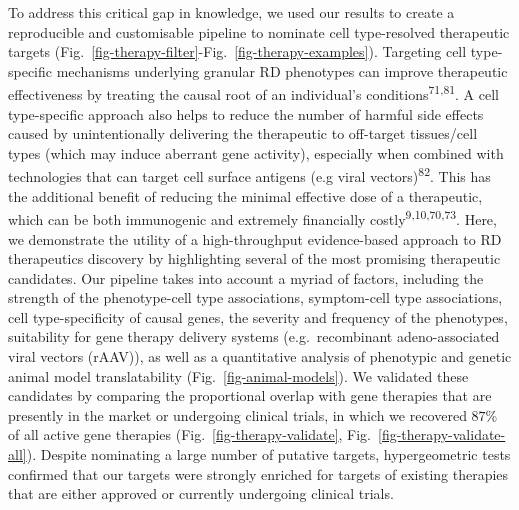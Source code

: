 \documentclass[
]{article}
\begin{document}
To address this critical gap in knowledge, we used our results to create
a reproducible and customisable pipeline to nominate cell type-resolved
therapeutic targets
(Fig.~\ref{fig-therapy-filter}-Fig.~\ref{fig-therapy-examples}).
Targeting cell type-specific mechanisms underlying granular RD
phenotypes can improve therapeutic effectiveness by treating the causal
root of an individual's conditions\textsuperscript{71,81}. A cell
type-specific approach also helps to reduce the number of harmful side
effects caused by unintentionally delivering the therapeutic to
off-target tissues/cell types (which may induce aberrant gene activity),
especially when combined with technologies that can target cell surface
antigens (e.g viral vectors)\textsuperscript{82}. This has the
additional benefit of reducing the minimal effective dose of a
therapeutic, which can be both immunogenic and extremely financially
costly\textsuperscript{9,10,70,73}. Here, we demonstrate the utility of
a high-throughput evidence-based approach to RD therapeutics discovery
by highlighting several of the most promising therapeutic candidates.
Our pipeline takes into account a myriad of factors, including the
strength of the phenotype-cell type associations, symptom-cell type
associations, cell type-specificity of causal genes, the severity and
frequency of the phenotypes, suitability for gene therapy delivery
systems (e.g.~recombinant adeno-associated viral vectors (rAAV)), as
well as a quantitative analysis of phenotypic and genetic animal model
translatability (Fig.~\ref{fig-animal-models}). We validated these
candidates by comparing the proportional overlap with gene therapies
that are presently in the market or undergoing clinical trials, in which
we recovered \(87\)\% of all active gene therapies
(Fig.~\ref{fig-therapy-validate}, Fig.~\ref{fig-therapy-validate-all}).
Despite nominating a large number of putative targets, hypergeometric
tests confirmed that our targets were strongly enriched for targets of
existing therapies that are either approved or currently undergoing
clinical trials.
\end{document}
